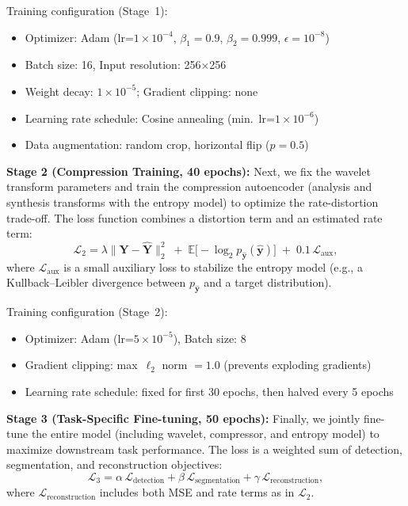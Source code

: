 \documentclass[conference]{IEEEtran}
\begin{document}
Training configuration (Stage~1):
\begin{itemize}
\item Optimizer: Adam (lr=$1\times 10^{-4}$, $\beta_1=0.9$, $\beta_2=0.999$, $\epsilon=10^{-8}$)
\item Batch size: 16, Input resolution: 256×256
\item Weight decay: $1\times 10^{-5}$; Gradient clipping: none
\item Learning rate schedule: Cosine annealing (min.~lr=$1\times 10^{-6}$)
\item Data augmentation: random crop, horizontal flip ($p=0.5$)
\end{itemize}

\textbf{Stage 2 (Compression Training, 40 epochs):} Next, we fix the wavelet transform parameters and train the compression autoencoder (analysis and synthesis transforms with the entropy model) to optimize the rate-distortion trade-off. The loss function combines a distortion term and an estimated rate term:
\begin{equation}
\mathcal{L}_2 = \lambda \|\mathbf{Y} - \hat{\mathbf{Y}}\|_2^2 \;+\; \mathbb{E}\big[-\log_2 p_{\hat{\mathbf{y}}}(\hat{\mathbf{y}})\big] \;+\; 0.1\,\mathcal{L}_{\text{aux}},
\end{equation}
where $\mathcal{L}_{\text{aux}}$ is a small auxiliary loss to stabilize the entropy model (e.g., a Kullback–Leibler divergence between $p_{\hat{\mathbf{y}}}$ and a target distribution).

Training configuration (Stage~2):
\begin{itemize}
\item Optimizer: Adam (lr=$5\times 10^{-5}$), Batch size: 8
\item Gradient clipping: max~$\ell_2$ norm $=1.0$ (prevents exploding gradients)
\item Learning rate schedule: fixed for first 30 epochs, then halved every 5 epochs
\end{itemize}

\textbf{Stage 3 (Task-Specific Fine-tuning, 50 epochs):} Finally, we jointly fine-tune the entire model (including wavelet, compressor, and entropy model) to maximize downstream task performance. The loss is a weighted sum of detection, segmentation, and reconstruction objectives:
\begin{equation}
\mathcal{L}_3 = \alpha\,\mathcal{L}_{\text{detection}} + \beta\,\mathcal{L}_{\text{segmentation}} + \gamma\,\mathcal{L}_{\text{reconstruction}},
\end{equation}
where $\mathcal{L}_{\text{reconstruction}}$ includes both MSE and rate terms as in $\mathcal{L}_2$.
\end{document}
